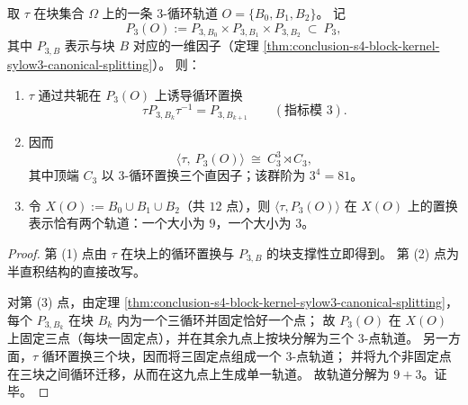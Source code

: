 \begin{conclusion}\label{con:conclusion-s4-collision-block-orbit-semidir-3group}
取 \(\tau\) 在块集合 \(\Omega\) 上的一条 \(3\)-循环轨道 \(O=\{B_0,B_1,B_2\}\)。
记
\[
P_3(O):=P_{3,B_0}\times P_{3,B_1}\times P_{3,B_2}\ \subset\ P_3,
\]
其中 \(P_{3,B}\) 表示与块 \(B\) 对应的一维因子（定理 \ref{thm:conclusion-s4-block-kernel-sylow3-canonical-splitting}）。
则：
\begin{enumerate}
  \item \(\tau\) 通过共轭在 \(P_3(O)\) 上诱导循环置换
  \[
  \tau P_{3,B_k}\tau^{-1}=P_{3,B_{k+1}}
  \qquad(\text{指标模 }3).
  \]
  \item 因而
  \[
  \langle\tau,\ P_3(O)\rangle\ \cong\ C_3^3\rtimes C_3,
  \]
  其中顶端 \(C_3\) 以 \(3\)-循环置换三个直因子；该群阶为 \(3^4=81\)。
  \item 令 \(X(O):=B_0\cup B_1\cup B_2\)（共 \(12\) 点），则 \(\langle\tau,P_3(O)\rangle\) 在 \(X(O)\) 上的置换表示恰有两个轨道：一个大小为 \(9\)，一个大小为 \(3\)。
\end{enumerate}
\end{conclusion}
\begin{proof}
第 (1) 点由 \(\tau\) 在块上的循环置换与 \(P_{3,B}\) 的块支撑性立即得到。
第 (2) 点为半直积结构的直接改写。
\par
对第 (3) 点，由定理 \ref{thm:conclusion-s4-block-kernel-sylow3-canonical-splitting}，
每个 \(P_{3,B_k}\) 在块 \(B_k\) 内为一个三循环并固定恰好一个点；
故 \(P_3(O)\) 在 \(X(O)\) 上固定三点（每块一固定点），并在其余九点上按块分解为三个 \(3\)-点轨道。
另一方面，\(\tau\) 循环置换三个块，因而将三固定点组成一个 \(3\)-点轨道；
并将九个非固定点在三块之间循环迁移，从而在这九点上生成单一轨道。
故轨道分解为 \(9+3\)。证毕。
\end{proof}


